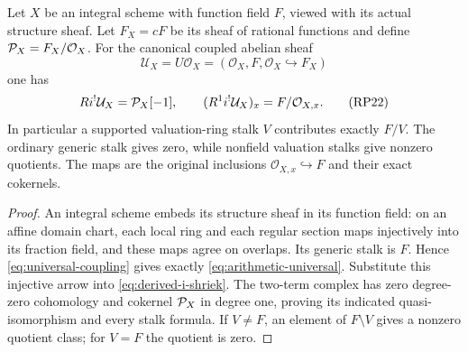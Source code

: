 \begin{theorem}
\label{thm:principal-parts}
Let $X$ be an integral scheme with function field $F$, viewed with its
actual structure sheaf. Let $F_X=cF$ be its sheaf of rational functions
and define $\mathcal P_X=F_X/\mathcal O_X$. For the canonical coupled abelian
sheaf
\[
 \mathcal U_X=U\mathcal O_X=(\mathcal O_X,F,
                      \mathcal O_X\hookrightarrow F_X)
 \tag{RP21}\label{eq:arithmetic-universal}
\]
one has
\[
 Ri^!\mathcal U_X=\mathcal P_X[-1],\qquad
 (R^1i^!\mathcal U_X)_x=F/\mathcal O_{X,x}.
 \tag{RP22}\label{eq:principal-parts-relative}
\]
In particular a supported valuation-ring stalk $V$ contributes exactly
$F/V$. The ordinary generic stalk gives zero, while nonfield valuation
stalks give nonzero quotients. The maps are the original inclusions
$\mathcal O_{X,x}\hookrightarrow F$ and their exact cokernels.
\end{theorem}
\begin{proof}
An integral scheme embeds its structure sheaf in its function field:
on an affine domain chart, each local ring and each regular section
maps injectively into its fraction field, and these maps agree on
overlaps. Its generic stalk is $F$. Hence
\eqref{eq:universal-coupling} gives exactly
\eqref{eq:arithmetic-universal}. Substitute this injective arrow into
\eqref{eq:derived-i-shriek}. The two-term complex has zero degree-zero
cohomology and cokernel $\mathcal P_X$ in degree one, proving its indicated
quasi-isomorphism and every stalk formula. If $V\ne F$, an element
of $F\setminus V$ gives a nonzero quotient class; for $V=F$ the
quotient is zero.
\end{proof}


